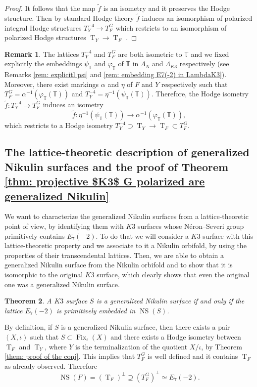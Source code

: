 \documentclass{amsart}
\newtheorem{thm}{Theorem}[section]
\theoremstyle{definition}
\newtheorem{remark}[thm]{Remark}
\numberwithin{equation}{section}
\numberwithin{equation}{section} \theoremstyle{definition}
\DeclareMathOperator{\NS}{NS}
\DeclareMathOperator{\T}{T}
\DeclareMathOperator{\Fix}{Fix}
\newcommand{\ra}{\rightarrow}
\begin{document}
\begin{proof}
 It follows that the map $\tilde f$ is an isometry and it preserves the Hodge structure. 
 Then by standard Hodge theory $\tilde f$ induces an isomorphism of polarized integral Hodge structures $T^{-4}_Y\rightarrow T^G_F$ which restricts to an isomorphism of polarized Hodge structures $\T_Y\rightarrow \T_F$ .
\end{proof}
\begin{remark}\label{rem: conjecture and marikings} The lattices $T_Y^{-4}$ and $T_F^G$ are both isometric to $\mathbb{T}$ and we fixed explicitly the embeddings $\psi_{\mathbb{T}}$ and $\varphi_{\mathbb{T}}$ of $\mathbb{T}$ in $\Lambda_N$ and $\Lambda_{K3}$ respectively (see Remarks \ref{rem: explicitl psi} and \ref{rem: embedding E7(-2) in LambdaK3}). Moreover, there exist markings $\alpha$ and $\eta$ of $F$ and $Y$ respectively such that $T_F^G=\alpha^{-1}(\varphi_{\mathbb{T}}(\mathbb{T}))$ and $T_Y^{-4}=\eta^{-1}(\psi_{\mathbb{T}}(\mathbb{T}))$. Therefore, the Hodge isometry $\tilde{f}\colon T_Y^{-4}\rightarrow T^G_F$ induces an isometry \begin{equation}\label{eq: Hodge f}\tilde{f}:\eta^{-1}(\psi_{\mathbb{T}}(\mathbb{T}))\ra \alpha^{-1}(\varphi_{\mathbb{T}}(\mathbb{T})),\end{equation} which restricts to a Hodge isometry $T_Y^{-4}\supset \T_Y\ra \T_F\subset T_F^G$. \end{remark}




\subsection{The lattice-theoretic description of generalized Nikulin surfaces and the proof of Theorem \ref{thm: projective $K3$ G polarized are generalized Nikulin}}

We want to characterize the generalized Nikulin surfaces from a lattice-theoretic point of view, by identifying them with $K3$ surfaces whose N\'eron--Severi group primitively contains $E_7(-2)$. To do that we will consider a $K3$ surface with this lattice-theoretic property and we associate to it a Nikulin orbifold, by using the properties of their transcendental lattices. Then, we are able to obtain a generalized Nikulin surface from the Nikulin orbifold and to show that it is isomorphic to the original $K3$ surface, which clearly shows that even the original one was a generalized Nikulin surface. 

\begin{thm}\label{thm: generalizes Nikulin iff generalized lattice in NS}
A $K3$ surface $S$ is a generalized Nikulin surface if and only if the lattice $E_7(-2)$ is primitively embedded in $\NS(S)$.\end{thm}
\proof By definition, if $S$ is a generalized Nikulin surface, then there exists a pair $(X,\iota)$ such that $S\subset \Fix_{\iota}(X)$ and there exists a Hodge isometry between $\T_F$ and $\T_Y$, where $Y$ is the terminalization of the quotient $X/\iota$, by Theorem \ref{them: proof of the conj}. This implies that $T_F^G$ is well defined and it contains $\T_F$ as already observed. Therefore $$\NS(F)=\left(\T_F\right)^{\perp}\supseteq (T_F^G)^{\perp}\simeq E_7(-2).$$ 
\end{document}
